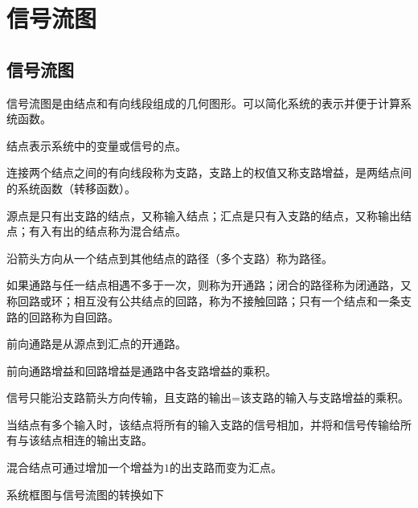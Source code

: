 \section{信号流图}

\subsection{信号流图}

\begin{BoxDefinition}[信号流图]
    信号流图是由结点和有向线段组成的几何图形。可以简化系统的表示并便于计算系统函数。
\end{BoxDefinition}

\begin{BoxDefinition}[信号流图的常用术语]
    结点表示系统中的变量或信号的点。

    连接两个结点之间的有向线段称为支路，支路上的权值又称支路增益，是两结点间的系统函数（转移函数）。

    源点是只有出支路的结点，又称输入结点；汇点是只有入支路的结点，又称输出结点；有入有出的结点称为混合结点。

    沿箭头方向从一个结点到其他结点的路径（多个支路）称为路径。

    如果通路与任一结点相遇不多于一次，则称为开通路；闭合的路径称为闭通路，又称回路或环；相互没有公共结点的回路，称为不接触回路；只有一个结点和一条支路的回路称为自回路。

    前向通路是从源点到汇点的开通路。

    前向通路增益和回路增益是通路中各支路增益的乘积。
\end{BoxDefinition}

\begin{BoxProperty}[信号流图的基本性质]
    信号只能沿支路箭头方向传输，且支路的输出=该支路的输入与支路增益的乘积。

    当结点有多个输入时，该结点将所有的输入支路的信号相加，并将和信号传输给所有与该结点相连的输出支路。

    混合结点可通过增加一个增益为$1$的出支路而变为汇点。
\end{BoxProperty}

系统框图与信号流图的转换如下

